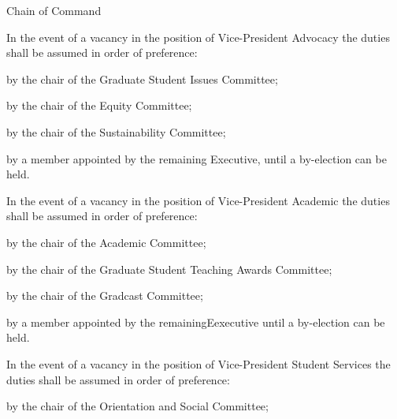 \begin{longenum}[ label*=\thesubsection.\arabic*., align=left]
	\item Chain of Command 
		\begin{longenum}[ label*=\arabic*., align=left]
			\item In the event of a vacancy in the position of Vice-President Advocacy the duties shall be assumed in order of preference:
			\begin{longenum}[ label*=\arabic*., align=left]
				\item by the chair of the Graduate Student Issues Committee;
				\item by the chair of the Equity Committee;
                \item by the chair of the Sustainability Committee;
				\item by a member appointed by the remaining Executive, until a by-election can be held.
			\end{longenum}
			\item In the event of a vacancy in the position of Vice-President Academic the duties shall be assumed in order of preference:
			\begin{longenum}[ label*=\arabic*., align=left]
				\item by the chair of the Academic Committee;
				\item by the chair of the Graduate Student Teaching Awards Committee;
				\item by the chair of the Gradcast Committee;
				\item by a member appointed by the remainingEexecutive until a by-election can be held.
			\end{longenum}
			\item In the event of a vacancy in the position of Vice-President Student Services the duties shall be assumed in order of preference: 
			\begin{longenum}[ label*=\arabic*., align=left]
				\item by the chair of the Orientation and Social Committee;

\end{longenum}
\end{longenum}
\end{longenum}
